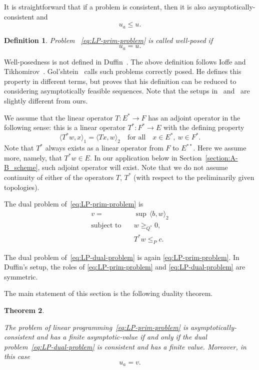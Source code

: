 \documentclass[[a4paper,english,12pt]{amsart}
\theoremstyle{plain}
\newtheorem{theorem}{Theorem}
\newtheorem{definition}[theorem]{Definition}
\theoremstyle{remark}
\begin{document}
It is straightforward that if a problem is consistent, then it is also asymptotically-consistent and
$$
u_a \le u.
$$


\begin{definition}

Problem ~\eqref{eq:LP-prim-problem} is called \emph{well-posed} if
$$
u_a = u.
$$

\end{definition}

Well-posedness is not defined in Duffin~\cite{Duffin}. The above definition follows Ioffe and Tikhomirov~\cite{I-T}. Gol'shtein~\cite{golstein} calls such problems correctly posed. He defines this property in different terms, but proves that his definition can be reduced to considering asymptotically feasible sequences. Note that the setups in~\cite{I-T} and~\cite{golstein} are slightly different from ours.

We assume that the linear operator $T : E^*  \to F$ has an adjoint operator in the following sense: this is a linear operator $T^* : F^* \to E$ with the defining property
$$
\langle T^*w, x \rangle_1 = \langle Tx, w \rangle_2  \quad \text{for all} \quad x \in E^*, \ w \in F^*.
$$
Note that $T^*$ always exists as a linear operator from $F$ to $E^{**}$. Here we assume more, namely, that $T^*w \in E$. 
In our application below in Section~\ref{section:A-B_scheme}, such adjoint operator will exist. Note that we do not assume continuity of either of the operators $T$, $T^*$ (with respect to the preliminarily given topologies). 


The dual problem of~\eqref{eq:LP-prim-problem} is
\begin{align} \label{eq:LP-dual-problem}
    v = & \sup \, \langle b, w \rangle_2 \\
    \text{subject to} \quad &  w \ge_{Q^*} 0,  \nonumber \\
    & T^*w  \le_{P} c. \nonumber
\end{align}

The dual problem of~\eqref{eq:LP-dual-problem} is again \eqref{eq:LP-prim-problem}. In Duffin's setup, the roles of \eqref{eq:LP-prim-problem} and \eqref{eq:LP-dual-problem} are symmetric.

The main statement of this section is the following duality theorem.

\begin{theorem} \label{theorem:Duffin-duality}

The problem of linear programming~\eqref{eq:LP-prim-problem} is asymptotically-consistent and has a finite asymptotic-value if and only if the dual problem~\eqref{eq:LP-dual-problem} is consistent and has a finite value. Moreover, in this case
$$
u_a = v.
$$

\end{theorem}
\end{document}
